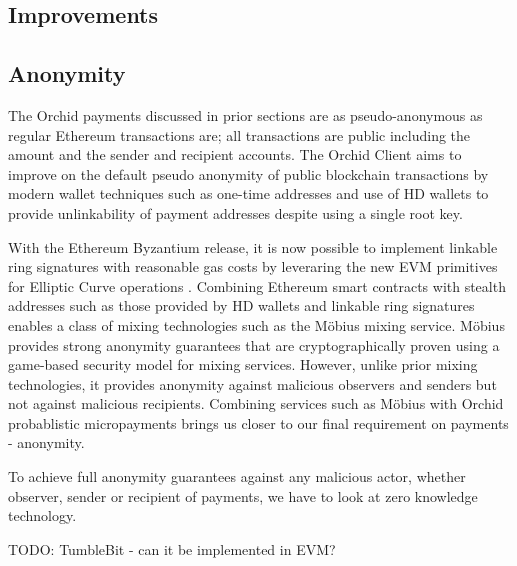 

\subsection{Improvements}

\subsection{Anonymity}
\label{sec:anon}

The Orchid payments discussed in prior sections are as pseudo-anonymous as regular Ethereum transactions are; all transactions are public including the amount and the sender and recipient accounts. The Orchid Client aims to improve on the default pseudo anonymity of public blockchain transactions by modern wallet techniques such as one-time addresses \cite{AddressReuse} and use of HD wallets \cite{HDWallets} to provide unlinkability of payment addresses despite using a single root key.

With the Ethereum Byzantium release, it is now possible to implement linkable ring signatures with reasonable gas costs by leveraring the new EVM primitives for Elliptic Curve operations \cite{ETHRingSigs}. Combining Ethereum smart contracts with stealth addresses such as those provided by HD wallets and linkable ring signatures enables a class of mixing technologies such as the Möbius\cite{Moebius} mixing service. Möbius provides strong anonymity guarantees that are cryptographically proven using a game-based security model for mixing services. However, unlike prior mixing technologies, it provides anonymity against malicious observers and senders but not against malicious recipients. Combining services such as Möbius with Orchid probablistic micropayments brings us closer to our final requirement on payments - anonymity.

To achieve full anonymity guarantees against any malicious actor, whether observer, sender or recipient of payments, we have to look at zero knowledge technology.

TODO: TumbleBit - can it be implemented in EVM?

